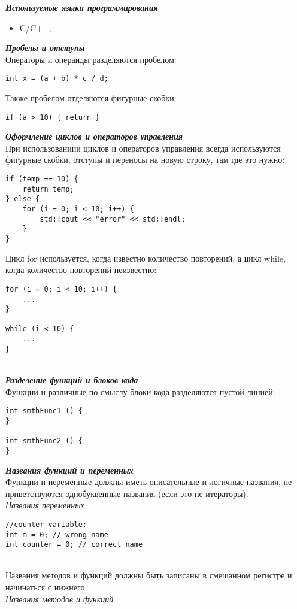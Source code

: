 \documentclass{article}
\begin{document}
\lstset{language=С++}
\textbf{\emph{Используемые языки программирования}}
\begin{itemize}
    \item C/C++;
\end{itemize}
\textbf{\emph{Пробелы и отступы}}
\\Операторы и операнды разделяются пробелом:
\begin{lstlisting}
int x = (a + b) * c / d;
\end{lstlisting}
Также пробелом отделяются фигурные скобки:
\begin{lstlisting}
if (a > 10) { return }
\end{lstlisting}
\textbf{\emph{Оформление циклов и операторов управления}}
\\При использованиии циклов и операторов управления всегда используются фигурные скобки, отступы и переносы на новую строку, там где это нужно:
\begin{lstlisting}
if (temp == 10) {
    return temp;
} else {
    for (i = 0; i < 10; i++) {
        std::cout << "error" << std::endl;
    }
}
\end{lstlisting}
Цикл for используется, когда известно количество повторений, а цикл while, когда
количество повторений неизвестно:
\begin{lstlisting}
for (i = 0; i < 10; i++) {
    ...
}

while (i < 10) {
    ...
}
\end{lstlisting}
\textbf{\emph{\\Разделение функций и блоков кода}}
\\Функции и различные по смыслу блоки кода разделяются пустой линией:
\begin{lstlisting}
int smthFunc1 () {
}

int smthFunc2 () {
}
\end{lstlisting}
\textbf{\emph{Названия функций и переменных}}
\\Функции и переменные должны иметь описательные и логичные названия, не приветствуются однобуквенные названия (если это не итераторы).
\textit{\\Названия переменных:}
\begin{lstlisting}
//counter variable:
int m = 0; // wrong name
int counter = 0; // correct name
\end{lstlisting}
\\Названия методов и функций должны быть записаны в смешанном регистре и начинаться с нижнего.
\textit{\\Названия методов и функций}
\end{document}
